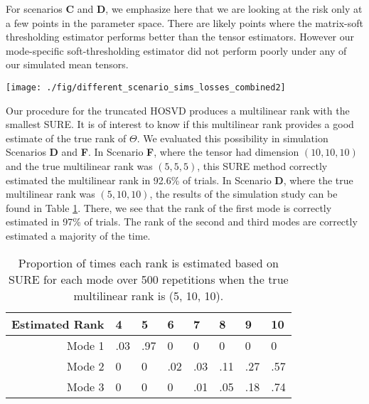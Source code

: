For scenarios \textbf{C} and \textbf{D}, we emphasize here that we are
looking at the risk only at a few points in the parameter space. There
are likely points where the matrix-soft thresholding estimator
performs better than the tensor estimators. However our mode-specific
soft-thresholding estimator did not perform poorly under any of our
simulated mean tensors.


\begin{figure*}
  \begin{center}
    \texttt{[image: ./fig/different\_scenario\_sims\_losses\_combined2]}
    \caption{Box plots of losses for the six estimators under different
      scenarios. The estimators include the mode-specific
      soft-thresholding (ST), truncated HOSVD (Tr), matrix
      soft-thresholding (MS), Efron-Morris (EM), James-Stein (JS), and
      maximum likelihood (X) estimators. In the scenarios, the mean tensor
      was simulated to have (\textbf{A}) uncorrelated elements,
      (\textbf{B}) full rank but dispersed singular values only along mode
      1, (\textbf{C}) AR-1 covariance along mode 1, (\textbf{D}) low rank
      only along mode 1, (\textbf{E}) full rank but dispersed singular
      values along all modes, and (\textbf{F}) rank $(5,5,5)$ with all the
      same non-zero singular values.}
    \label{fig:sim.results}
  \end{center}
\end{figure*}

Our procedure for the truncated HOSVD produces a multilinear rank with
the smallest SURE. It is of interest to know if this multilinear rank
provides a good estimate of the true rank of $\Theta$. We evaluated
this possibility in simulation Scenarios \textbf{D} and \textbf{F}. In
Scenario \textbf{F}, where the tensor had dimension $(10,10,10)$ and
the true multilinear rank was $(5,5,5)$, this SURE method correctly
estimated the multilinear rank in 92.6\% of trials. In Scenario
\textbf{D}, where the true multilinear rank was $(5,10,10)$, the
results of the simulation study can be found in Table
\ref{tab:rank.est}. There, we see that the rank of the first mode is
correctly estimated in 97\% of trials. The rank of the second and
third modes are correctly estimated a majority of the time.

\begin{table}[ht]
\centering
\begin{tabular}{rlllllll}
  \hline
 Estimated Rank & 4 & 5 & 6 & 7 & 8 & 9 & 10 \\
  \hline
Mode 1 & .03 & .97 & 0 & 0 & 0 & 0 & 0 \\
  Mode 2 & 0 & 0 & .02 & .03 & .11 & .27 & .57 \\
  Mode 3 & 0 & 0 & 0 & .01 & .05 & .18 & .74 \\
   \hline
\end{tabular}
\caption{Proportion of times each rank is estimated based on SURE for each mode over 500 repetitions when the true multilinear rank is (5, 10, 10).}
\label{tab:rank.est}
\end{table}
